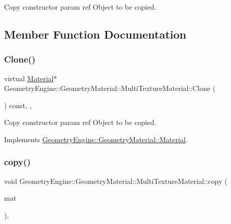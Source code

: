 Copy constructor param ref Object to be copied. 

\subsection{Member Function Documentation}
\mbox{\label{class_geometry_engine_1_1_geometry_material_1_1_multi_texture_material_a66cef99b68270e1399830bc1b8bc8502}} 
\subsubsection{\texorpdfstring{Clone()}{Clone()}}
{\footnotesize\ttfamily virtual \mbox{\hyperlink{class_geometry_engine_1_1_geometry_material_1_1_material}{Material}}$\ast$ Geometry\+Engine\+::\+Geometry\+Material\+::\+Multi\+Texture\+Material\+::\+Clone (\begin{DoxyParamCaption}{ }\end{DoxyParamCaption}) const\hspace{0.3cm}{\ttfamily [inline]}, {\ttfamily [override]}, {\ttfamily [virtual]}}

Copy constructor param ref Object to be copied. 

Implements \mbox{\hyperlink{class_geometry_engine_1_1_geometry_material_1_1_material_ae5513ff06d536365e18ddc5e07e79784}{Geometry\+Engine\+::\+Geometry\+Material\+::\+Material}}.

\mbox{\label{class_geometry_engine_1_1_geometry_material_1_1_multi_texture_material_add208366ae882ad1bd9c6029969902b4}} 
\subsubsection{\texorpdfstring{copy()}{copy()}}
{\footnotesize\ttfamily void Geometry\+Engine\+::\+Geometry\+Material\+::\+Multi\+Texture\+Material\+::copy (\begin{DoxyParamCaption}\item[{const \mbox{\hyperlink{class_geometry_engine_1_1_geometry_material_1_1_multi_texture_material}{Multi\+Texture\+Material}} \&}]{mat }\end{DoxyParamCaption})\hspace{0.3cm}{\ttfamily [protected]}, {\ttfamily [virtual]}}

